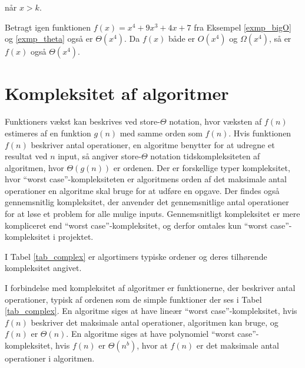 når $x>k$. \\
\begin{exmp}
Betragt igen funktionen $f(x)=x^4+9x^3+4x+7$ fra Eksempel \ref{exmp_bigO} og \ref{exmp_theta} også er $\Theta(x^4)$.
Da $f(x)$ både er $O(x^4)$ og $\Omega (x^4)$, så er $f(x)$ også $\Theta (x^4)$.
\end{exmp}

\section{Kompleksitet af algoritmer}
Funktioners vækst kan beskrives ved store-$\Theta$ notation, hvor væksten af $f(n)$ estimeres af en funktion $g(n)$ med samme orden som $f(n)$. 
Hvis funktionen $f(n)$ beskriver antal operationer, en algoritme benytter for at udregne et resultat ved $n$ input, så angiver store-$\Theta$ notation tidskompleksiteten af algoritmen, hvor $\Theta(g(n))$ er ordenen. 
Der er forskellige typer kompleksitet, hvor “worst case”-kompleksiteten er algoritmens orden af det maksimale antal operationer en algoritme skal bruge for at udføre en opgave. 
Der findes også gennemsnitlig kompleksitet, der anvender det gennemsnitlige antal operationer for at løse et problem for alle mulige inputs.
Gennemsnitligt kompleksitet er mere kompliceret end “worst case”-kompleksitet, og derfor omtales kun “worst case”-kompleksitet i projektet.

I Tabel \ref{tab_complex} er algortimers typiske ordener og deres tilhørende kompleksitet angivet. 



I forbindelse med kompleksitet af algoritmer er funktionerne, der beskriver antal operationer, typisk af ordenen som de simple funktioner der ses i Tabel \ref{tab_complex}. 
En algoritme siges at have lineær “worst case”-kompleksitet, hvis $f(n)$ beskriver det maksimale antal operationer,  algoritmen kan bruge, og $f(n)$ er $\Theta(n)$. 
En algoritme siges at have polynomiel “worst case”-kompleksitet, hvis $f(n)$ er $\Theta(n^b)$, hvor at $f(n)$ er det maksimale antal operationer i algoritmen.

